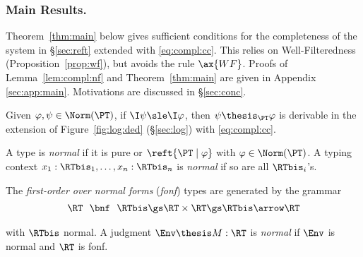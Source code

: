 \subsubsection{Main Results.}
\label{sec:main}
Theorem~\ref{thm:main} below
gives sufficient conditions for the completeness of the system in \S\ref{sec:reft}
extended with \eqref{eq:compl:cc}.
%
This relies on Well-Filteredness (Proposition~\ref{prop:wf}),
but avoids the rule $\ax{WF}$.
Proofs of Lemma~\ref{lem:compl:nf} and Theorem~\ref{thm:main}
are given in Appendix \ref{sec:app:main}.
Motivations are discussed in \S\ref{sec:conc}.

\begin{lemma}
\label{lem:compl:nf}
Given $\varphi,\psi \in \Norm(\PT)$,
if $\I\psi \sle \I\varphi$,
then $\psi \thesis_\PT \varphi$
is derivable in the extension of Figure~\ref{fig:log:ded} (\S\ref{sec:log})
with \eqref{eq:compl:cc}.
\end{lemma}


\begin{definition}
A type is \emph{normal} if it is pure or 
$\reft{\PT \mid \varphi}$ with $\varphi \in \Norm(\PT)$.
A typing context $x_1:\RTbis_1,\dots,x_n : \RTbis_n$
is \emph{normal} if so are all $\RTbis_i$'s.

The \emph{first-order over normal forms} (\emph{fonf}) types
are generated by the grammar
\[
\begin{array}{r @{\ \ }c@{\ \ } l}
    \RT
&   \bnf
&   \RTbis
\gs \RT \times \RT
\gs \RTbis \arrow \RT
\end{array}
\]

\noindent
with $\RTbis$ normal.
%
A judgment $\Env \thesis M : \RT$ is \emph{normal}
if $\Env$ is normal and $\RT$ is fonf.
\end{definition}

